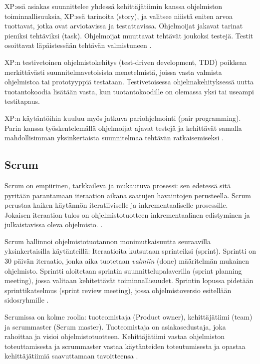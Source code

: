 \documentclass[finnish]{tktltiki2}
\theoremstyle{definition}
\theoremstyle{remark}
\begin{document}
{XP:ssä asiakas suunnittelee yhdessä kehittäjätiimin kanssa ohjelmiston  toiminnallisuuksia, XP:ssä tarinoita (story), ja valitsee niiistä eniten arvoa tuottavat, jotka ovat arviotavissa ja testattavissa. Ohjelmoijat jakavat tarinat pieniksi tehtäviksi (task). Ohjelmoijat muuttavat tehtävät joukoksi testejä. Testit osoittavat läpäistessään tehtävän valmistuneen \cite{BEC99}.

XP:n testivetoinen ohjelmistokehitys (test-driven development, TDD) poikkeaa merkittävästi suunnitelmavetoisista menetelmistä, joissa vasta valmista ohjelmistoa tai prototyyppiä testataan. Testivetoisessa ohjelmakehityksessä uutta tuotantokoodia lisätään vasta, kun tuotantokoodille on olemassa yksi tai useampi testitapaus.

XP:n käytäntöihin kuuluu myös jatkuva pariohjelmointi (pair programming). Parin kanssa työskentelemällä ohjelmoijat ajavat testejä ja kehittävät samalla mahdollisimman yksinkertaista suunnitelmaa tehtävän ratkaisemiseksi \cite{BEC99}.

\subsection{Scrum}

Scrum on empiirinen, tarkkaileva ja mukautuva prosessi: sen edetessä sitä pyritään parantamaan iteraation aikana saatujen havaintojen perusteella.  Scrum perustaa kaiken käytännön iteratiiviselle ja inkrementaaliselle prosessille. Jokaisen iteraation tulos on ohjelmistotuotteen inkrementaalinen edistyminen ja julkaistavissa oleva ohjelmisto. \cite{SCH09}.

Scrum hallinnoi ohjelmistotuotannon monimutkaisuutta seuraavilla yksinkertaisilla käytänteillä:
Iteraatioita kutsutaan sprinteiksi (sprint). Sprintti on 30 päivän iteraatio, jonka aika tuotetaan \textit{valmiin} (done) määritelmän mukainen ohjelmisto. Sprintti aloitetaan sprintin suunnittelupalaverilla (sprint planning meeting), jossa valitaan kehitettävät toiminnallisuudet. Sprintin lopussa pidetään sprinttikatselmus (sprint review meeting), jossa ohjelmistoversio esitellään sidosryhmille \cite{SCH09}.

Scrumissa on kolme roolia: tuoteomistaja (Product owner), kehittäjätiimi (team) ja scrummaster (Scrum master). Tuoteomistaja on asiakasedustaja, joka rahoittaa ja visioi ohjelmistotuotteen. Kehittäjätiimi vastaa ohjelmiston toteuttamisesta ja scrummaster vastaa käytänteiden toteutumisesta ja opastaa kehittäjätiimiä saavuttamaan tavoitteensa \cite{SCH09}.

}
\end{document}
